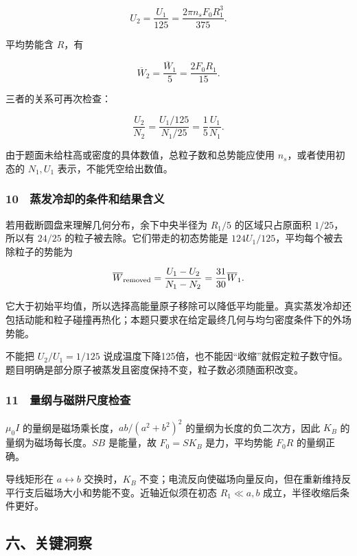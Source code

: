 \documentclass[12pt,a4paper,fontset=fandol]{ctexart}
\begin{document}
\[\boxed{U_2=\frac{U_1}{125}
=\frac{2\pi n_sF_0R_1^3}{375}.}\]

平均势能含 \(R\)，有

\[\boxed{\overline W_2=\frac{\overline W_1}{5}
=\frac{2F_0R_1}{15}.}\]

三者的关系可再次检查：

\[\frac{U_2}{N_2}
=\frac{U_1/125}{N_1/25}
=\frac15\frac{U_1}{N_1}.\]

由于题面未给柱高或密度的具体数值，总粒子数和总势能应使用
\(n_s\)，或者使用初态的 \(N_1,U_1\) 表示，不能凭空给出数值。

\subsubsection{10　蒸发冷却的条件和结果含义}\label{ux84b8ux53d1ux51b7ux5374ux7684ux6761ux4ef6ux548cux7ed3ux679cux542bux4e49}

若用截断圆盘来理解几何分布，余下中央半径为 \(R_1/5\) 的区域只占原面积
\(1/25\)，所以有 \(24/25\) 的粒子被去除。它们带走的初态势能是
\(124U_1/125\)，平均每个被去除粒子的势能为

\[\overline W_{\rm removed}
=\frac{U_1-U_2}{N_1-N_2}
=\frac{31}{30}\overline W_1.\]

它大于初始平均值，所以选择高能量原子移除可以降低平均能量。真实蒸发冷却还包括动能和粒子碰撞再热化；本题只要求在给定最终几何与均匀密度条件下的外场势能。

不能把 \(U_2/U_1=1/125\)
说成温度下降125倍，也不能因``收缩''就假定粒子数守恒。题目明确是部分原子被蒸发且密度保持不变，粒子数必须随面积改变。

\subsubsection{11　量纲与磁阱尺度检查}\label{ux91cfux7eb2ux4e0eux78c1ux9631ux5c3aux5ea6ux68c0ux67e5}

\(\mu_0I\) 的量纲是磁场乘长度，\(ab/(a^2+b^2)^2\)
的量纲为长度的负二次方，因此 \(K_B\) 的量纲为磁场每长度。\(SB\)
是能量，故 \(F_0=SK_B\) 是力，平均势能 \(F_0R\) 的量纲正确。

导线矩形在 \(a\leftrightarrow b\) 交换时，\(K_B\)
不变；电流反向使磁场向量反向，但在重新维持反平行支后磁场大小和势能不变。近轴近似须在初态
\(R_1\ll a,b\) 成立，半径收缩后条件更好。

\subsection{六、关键洞察}\label{ux516dux5173ux952eux6d1eux5bdf-4}
\end{document}
